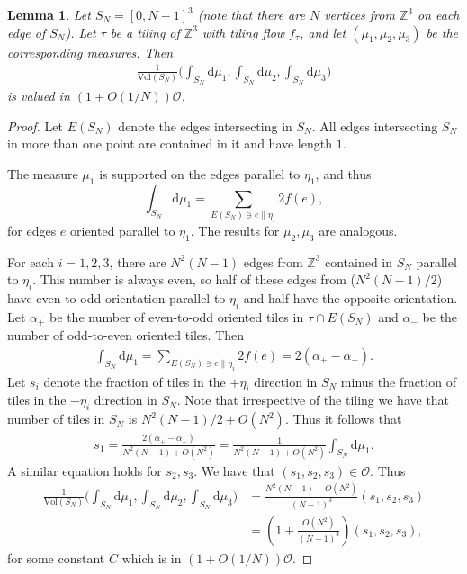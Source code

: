 \documentclass[11pt]{article}
\newtheorem{lemma}[thm]{Lemma}
\theoremstyle{remark}
\theoremstyle{definition}
\newcommand{\m}[1]{\mathbb{#1}}
\newcommand{\dd}{\mathrm{d}}
\begin{document}
\begin{lemma}\label{lem:niceboxes}
Let $S_N = [0,N-1]^3$ (note that there are $N$ vertices from $\m Z^3$ on each edge of $S_N$). Let $\tau$ be a tiling of $\mathbb{Z}^3$ with tiling flow $f_\tau$, and let $(\mu_1,\mu_2,\mu_3)$ be the corresponding measures. Then
\begin{align*}
    \frac{1}{\text{Vol}(S_N)} \bigg(\int_{S_N} \dd\mu_1, \int_{S_N} \dd\mu_2, \int_{S_N} \dd\mu_3 \bigg)
\end{align*}
is valued in $(1+ O(1/N)) \mathcal{O}$.
\end{lemma}
\begin{proof}
    Let $E(S_N)$ denote the edges intersecting in $S_N$. All edges intersecting $S_N$ in more than one point are contained in it and have length $1$. 
    
    The measure $\mu_1$ is supported on the edges parallel to $\eta_1$, and thus 
    $$\int_{S_N}\dd\mu_1 = \sum_{E(S_N)\ni e\parallel \eta_1} 2f(e),$$
    for edges $e$ oriented parallel to $\eta_1$. The results for $\mu_2,\mu_3$ are analogous. 
    
    For each $i=1,2,3$, there are $N^2(N-1)$ edges from $\m Z^3$ contained in $S_N$ parallel to $\eta_i$. This number is always even, so half of these edges from ($N^2(N-1)/2$) have even-to-odd orientation parallel to $\eta_i$ and half have the opposite orientation. Let $\alpha_+$ be the number of even-to-odd oriented tiles in $\tau\cap E(S_N)$ and $\alpha_-$ be the number of odd-to-even oriented tiles. Then
    \begin{align*}
        \int_{S_N} \dd\mu_1 = \sum_{E(S_N)\ni e\parallel \eta_i} 2 f(e) = 2(\alpha_+ - \alpha_-).
    \end{align*}
    Let $s_i$ denote the fraction of tiles in the $+\eta_i$ direction in $S_N$ minus the fraction of tiles in the $-\eta_i$ direction in $S_N$. Note that irrespective of the tiling we have that number of tiles in $S_N$ is $N^2(N-1)/2 +O(N^2)$. Thus it follows that
    \begin{align*}
        s_1 = \frac{2(\alpha_+-\alpha_-)}{N^2(N-1)+O(N^2)} = \frac{1}{N^2(N-1)+O(N^2)} \int_{S_N} \dd\mu_1.
    \end{align*}
    A similar equation holds for $s_2,s_3$. We have that $(s_1,s_2,s_3)\in \mathcal{O}$. Thus 
    \begin{align*}
        \frac{1}{\text{Vol}(S_N)} \bigg(\int_{S_N} \dd\mu_1, \int_{S_N} \dd\mu_2, \int_{S_N} \dd\mu_3 \bigg) &= \frac{N^2(N-1)+O(N^2)}{(N-1)^3}(s_1, s_2, s_3) \\
        &= (1 + \frac{O(N^2)}{(N-1)^3})(s_1,s_2,s_3),
    \end{align*}
    for some constant $C$ which is in $(1+ O(1/N)) \mathcal{O}$.
\end{proof}
\end{document}
